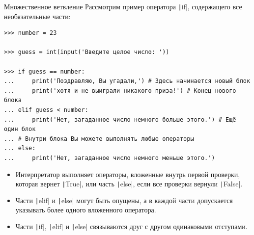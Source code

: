 \documentclass[aspectratio=169]{beamer}	%
\begin{document}
\begin{frame}[fragile]{Множественное ветвление}
\scriptsize
Рассмотрим пример оператора \texttt|if|, содержащего все необязательные части:

\begin{verbatim}
>>> number = 23

>>> guess = int(input('Введите целое число: '))

>>> if guess == number:
...     print('Поздравляю, Вы угадали,') # Здесь начинается новый блок
...     print('хотя и не выиграли никакого приза!') # Конец нового блока
... elif guess < number:
...     print('Нет, загаданное число немного больше этого.') # Ещё один блок 
... # Внутри блока Вы можете выполнять любые операторы
... else:
...     print('Нет, загаданное число немного меньше этого.')
\end{verbatim}

\begin{itemize}
	\item  Интерпретатор выполняет операторы, вложенные внутрь первой проверки, которая вернет \texttt|True|, или часть \texttt|else|, если все проверки вернули \texttt|False|. 
	
	\item Части \texttt|elif| и \texttt|else| могут быть опущены, а в каждой части допускается указывать более одного вложенного оператора. 
	
	\item Части \texttt|if|, \texttt|elif| и \texttt|else| связываются друг с другом одинаковыми отступами.
\end{itemize}

\end{frame}


%	
%	
%	 
%
%
%    
%    
%
%
%
\end{document}
